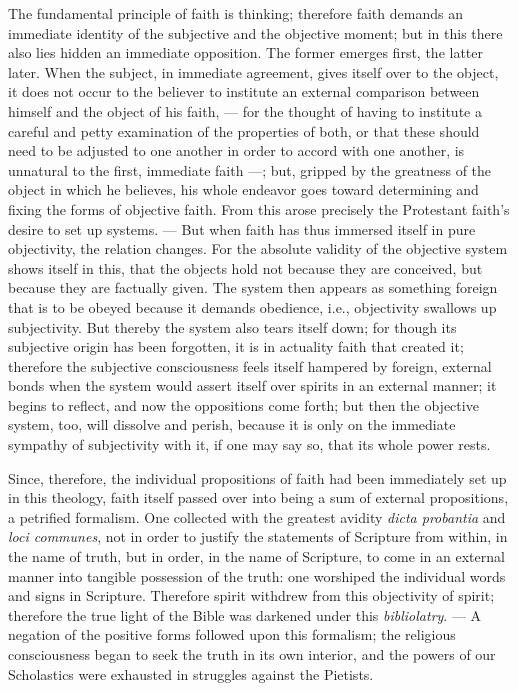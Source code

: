 \documentclass[12pt]{book}
\newcommand{\opage}[1]{\marginnote{\footnotesize\textit{[#1]}}}
\begin{document}
The fundamental principle of faith is thinking; therefore faith demands an
immediate identity of the subjective and the objective moment; but in this
there also lies hidden an immediate opposition. The former emerges first, the
latter later. When the subject, in immediate agreement, gives itself over to
the object, it does not occur to the believer to institute an external
comparison between himself and the object of his faith, --- for the thought of
having to institute a careful and petty examination of the properties of both,
or that these should need to be adjusted to one another in order to accord
with one another, is unnatural to the first, immediate faith ---; but, gripped
by the greatness of the object in which he believes, his whole endeavor goes
toward determining and fixing the forms of objective faith. From this arose
precisely the Protestant faith's desire to set up systems. --- But when faith
has thus immersed itself in pure objectivity, the relation changes. For the
absolute validity of the objective system shows itself in this, that the
objects hold not because they are conceived, but because they are factually
given. The system then appears as something foreign that is to be obeyed
because it demands obedience, i.e., objectivity swallows up subjectivity. But
thereby the system also tears itself down; for though its subjective origin
has been forgotten, it is in actuality faith that created it; therefore the
subjective consciousness feels itself hampered by foreign, external bonds when
the system would assert itself over spirits in an external manner; it begins
to reflect, and now the oppositions come forth; but then the objective system,
too, will dissolve and perish,
\opage{86} %
because it is only on the immediate sympathy of subjectivity with it, if one
may say so, that its whole power rests.

Since, therefore, the individual propositions of faith had been immediately
set up in this theology, faith itself passed over into being a sum of external
propositions, a petrified formalism. One collected with the greatest avidity
\textit{dicta probantia} and \textit{loci communes}, not in order to justify
the statements of Scripture from within, in the name of truth, but in order, in
the name of Scripture, to come in an external manner into tangible possession
of the truth: one worshiped the individual words and signs in Scripture.
Therefore spirit withdrew from this objectivity of spirit; therefore the true
light of the Bible was darkened under this \emph{bibliolatry}. --- A negation
of the positive forms followed upon this formalism; the religious
consciousness began to seek the truth in its own interior, and the powers of
our Scholastics were exhausted in struggles against the Pietists.
\end{document}

